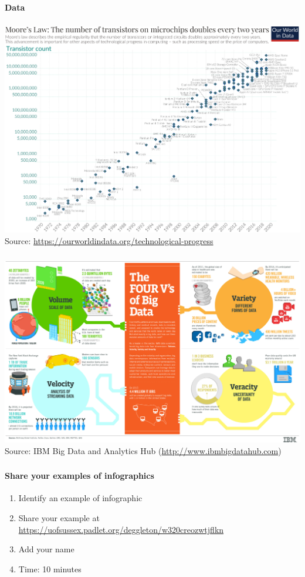 \documentclass[8pt]{beamer}
\begin{document}
\begin{frame}
\framesubtitle{Data}
\frametitle{\insertsection}
\centering
\includegraphics[width=0.9\linewidth]{moore.png}\\
\tiny{Source: \url{https://ourworldindata.org/technological-progress}}
\end{frame}


\begin{frame}
\frametitle{\insertsection}
\centering
\includegraphics[width=\linewidth]{bigdata}\\
\tiny{Source: IBM Big Data and Analytics Hub (\url{http://www.ibmbigdatahub.com})}
\end{frame}


\begin{frame}
\frametitle{\insertsection}
\framesubtitle{Share your examples of infographics}


\begin{enumerate}
	\item Identify an example of infographic
	\item Share your example at\\ \url{https://uofsussex.padlet.org/deggleton/w320creozwtjflkn}
	\item Add your name
	\item Time: 10 minutes
\end{enumerate}

\end{frame}
\end{document}
